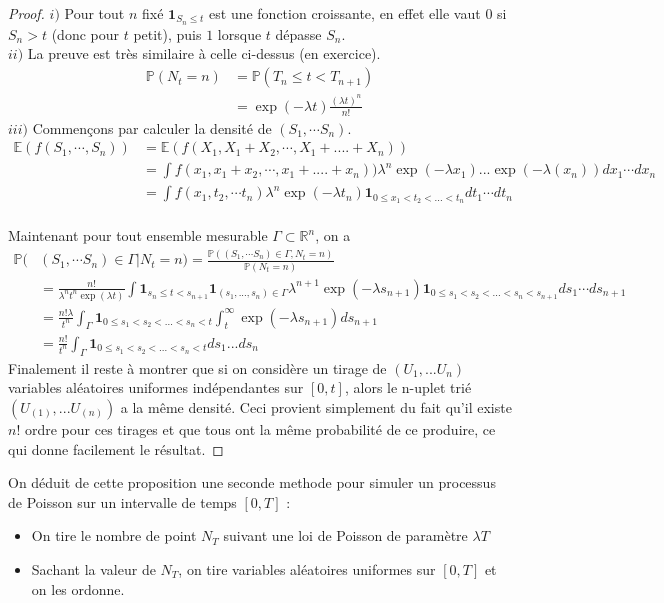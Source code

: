 \documentclass[a4paper,12pt]{book}
\newcommand{\E}{\mathbb{E}}
\newcommand{\R}{\mathbb{R}}
\renewcommand{\P}{\mathbb{P}}
\begin{document}
\begin{proof}
$i)$ Pour tout $n$ fixé $\mathbf{1}_{S_n\le t }$ est une fonction croissante, en effet elle vaut $0$ si $S_n>t$ (donc pour $t$ petit), puis $1$ lorsque $t$ dépasse $S_n$.\\
$ii)$ La preuve est très similaire à celle ci-dessus (en exercice).\\
\begin{align*}
\P(N_t=n)&=\P(T_n\le t<T_{n+1} )\\
&=\exp(-\lambda t) \frac{(\lambda t)^n}{n!}
\end{align*}
$iii)$
Commençons par calculer la densité de $(S_1, \cdots S_n)$.
\begin{align*}
\E(f(S_1, \cdots, S_n))&=\E(f(X_1, X_1+X_2, \cdots , X_1+.... +X_n))\\
&= \int f(x_1, x_1+x_2, \cdots ,x_1+.... +x_n)) \lambda^n \exp(-\lambda x_1) ...\exp(-\lambda(x_n)) dx_1\cdots dx_n\\
&= \int f(x_1, t_2, \cdots t_n) \lambda^n \exp(-\lambda t_n) \mathbf{1}_{0\le x_1<t_2<...<t_n} dt_1\cdots dt_n\\
\end{align*}

Maintenant  pour tout ensemble mesurable $\Gamma\subset\R^n$, on a
\begin{align*}
\P(&(S_1, \cdots S_n )\in\Gamma\lvert N_t=n)=\frac{\P((S_1, \cdots S_n )\in\Gamma, N_t=n)}{\P(N_t=n)}\\
&=\frac{n!}{\lambda^nt^n\exp(\lambda t)} \int \mathbf{1}_{ s_n\le t<s_{n+1}} \mathbf{1}_{(s_1,..., s_n)\in \Gamma } \lambda^{n+1}\exp(-\lambda s_{n+1}) \mathbf{1}_{0\le s_1<s_2<...<s_n<s_{n+1}} ds_1\cdots ds_{n+1}\\
&=\frac{n !\lambda}{t^n}\int_{\Gamma}\mathbf{1}_{0\le s_1<s_2<...<s_n<t} \int_t^\infty \exp(-\lambda s_{n+1}) ds_{n+1}\\
&= \frac{n!}{t^n} \int_{\Gamma}\mathbf{1}_{0\le s_1<s_2<...<s_n<t} ds_1 ...ds_n
\end{align*}
Finalement il reste à montrer que si on considère un tirage de $(U_1, ... U_n)$ variables aléatoires uniformes indépendantes sur $[0,t]$, alors le n-uplet trié $(U_{(1)}, ... U_{(n)})$ a la même densité. Ceci provient simplement du fait qu'il existe $n!$ ordre pour ces tirages et que tous ont la même probabilité de ce produire, ce qui donne facilement le résultat.
\end{proof}
On déduit de cette proposition une seconde methode pour simuler un processus de Poisson sur un intervalle de temps $[0,T]$ :
\begin{itemize}
\item On tire le nombre de point $N_T$ suivant une loi de Poisson de paramètre $\lambda T$
\item Sachant la valeur de $N_T$, on tire variables aléatoires uniformes sur $[0,T]$ et on les ordonne.
\end{itemize}
\end{document}

